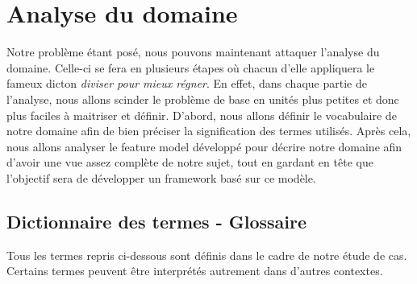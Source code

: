 \section{Analyse du domaine}

Notre problème étant posé,  nous pouvons maintenant attaquer l'analyse du domaine.  Celle-ci se fera en plusieurs étapes où chacun d'elle appliquera le fameux dicton \textit{diviser pour mieux régner}.  En effet,  dans chaque partie de l'analyse,  nous allons scinder le problème de base en unités plus petites et donc plus faciles à maitriser et définir.  D'abord,  nous allons définir  le vocabulaire de notre domaine afin de bien préciser la signification des termes utilisés.  Après cela,  nous allons analyser le feature model développé pour décrire notre domaine afin d'avoir une vue assez complète de notre sujet,  tout en gardant en tête que l'objectif sera de développer un framework basé sur ce modèle.  

\subsection{Dictionnaire des termes - Glossaire}
\label{dicoTermes}
Tous les termes repris ci-dessous sont définis dans le cadre de notre étude de cas.  Certains termes peuvent être interprétés autrement dans d'autres contextes.

